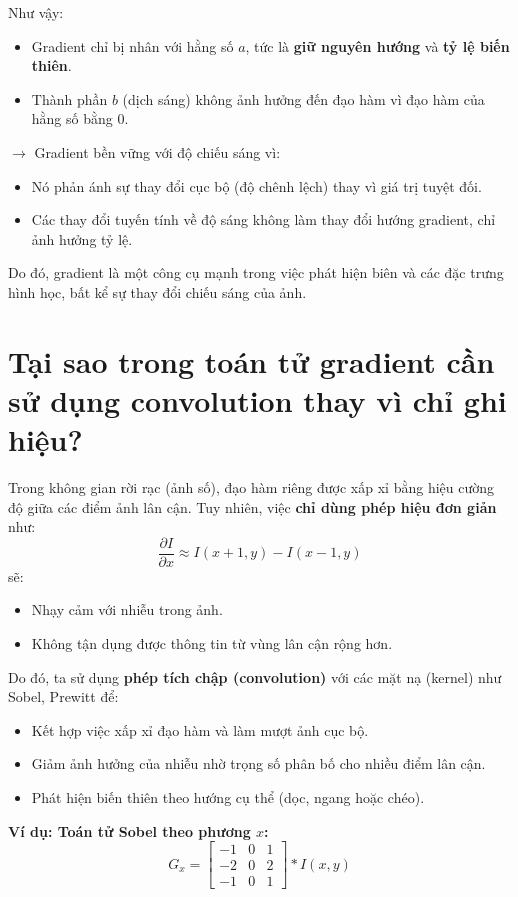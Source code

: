 \documentclass[12pt]{article}
\begin{document}
	Như vậy:
	\begin{itemize}
	\item Gradient chỉ bị nhân với hằng số $a$, tức là \textbf{giữ nguyên hướng} và \textbf{tỷ lệ biến thiên}.
	\item Thành phần $b$ (dịch sáng) không ảnh hưởng đến đạo hàm vì đạo hàm của hằng số bằng 0.
	\end{itemize}
	
	$\rightarrow$ Gradient bền vững với độ chiếu sáng vì:
	\begin{itemize}
	\item Nó phản ánh sự thay đổi cục bộ (độ chênh lệch) thay vì giá trị tuyệt đối.
	\item Các thay đổi tuyến tính về độ sáng không làm thay đổi hướng gradient, chỉ ảnh hưởng tỷ lệ.
	\end{itemize}
	
	Do đó, gradient là một công cụ mạnh trong việc phát hiện biên và các đặc trưng hình học, bất kể sự thay đổi chiếu sáng của ảnh.
	
	\section{Tại sao trong toán tử gradient cần sử dụng convolution thay vì chỉ ghi hiệu?}
	
	Trong không gian rời rạc (ảnh số), đạo hàm riêng được xấp xỉ bằng hiệu cường độ giữa các điểm ảnh lân cận. Tuy nhiên, việc \textbf{chỉ dùng phép hiệu đơn giản} như:
	\[
	\frac{\partial I}{\partial x} \approx I(x+1, y) - I(x-1, y)
	\]
	sẽ:
	\begin{itemize}
	\item Nhạy cảm với nhiễu trong ảnh.
	\item Không tận dụng được thông tin từ vùng lân cận rộng hơn.
	\end{itemize}
	
	Do đó, ta sử dụng \textbf{phép tích chập (convolution)} với các mặt nạ (kernel) như Sobel, Prewitt để:
	\begin{itemize}
	\item Kết hợp việc xấp xỉ đạo hàm và làm mượt ảnh cục bộ.
	\item Giảm ảnh hưởng của nhiễu nhờ trọng số phân bố cho nhiều điểm lân cận.
	\item Phát hiện biến thiên theo hướng cụ thể (dọc, ngang hoặc chéo).
	\end{itemize}
	
	\textbf{Ví dụ: Toán tử Sobel theo phương $x$:}
	\[
	G_x =
	\begin{bmatrix}
	-1 & 0 & 1 \\
	-2 & 0 & 2 \\
	-1 & 0 & 1
	\end{bmatrix}
	\ast I(x, y)
	\]
	
\end{document}
